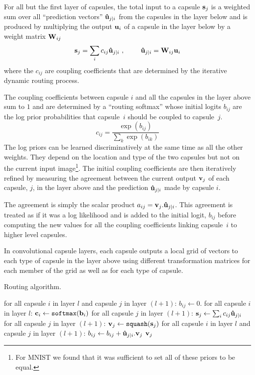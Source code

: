 \documentclass{article}
\begin{document}
For all but the first layer of capsules, the total input to a capsule ${\bf s}_j$ is a weighted sum over all ``prediction vectors'' ${\bf \hat{u}}_{j|i}$ from the capsules in the layer below and is produced by multiplying the output  ${\bf u}_i$ of a capsule in the layer below by a weight matrix  ${\bf W}_{ij}$
\begin{equation}
{\bf s}_j = \sum_i c_{ij} {\bf \hat{u}}_{j|i} \ , \ \ \ \ \ \ \ 
{\bf \hat{u}}_{j|i} = {\bf W}_{ij}{\bf u}_i 
\end{equation}where the $c_{ij}$ are coupling coefficients that are determined by the iterative dynamic routing process. 

The coupling coefficients between capsule $i$ and all the capsules in the layer above sum to $1$ and are determined by a ``routing softmax'' whose initial logits $b_{ij}$ are the log prior probabilities that capsule~$i$ should be coupled to capsule~$j$. 
\begin{equation}
c_{ij} = \frac{\exp(b_{ij})}{\sum_k \exp(b_{ik})}
\label{softmax}
\end{equation}
The log priors can be learned discriminatively at the same time as all the other weights.  They depend on the location and type of the two capsules but not on the current input image\footnote{For MNIST we found that it was sufficient to set all of these priors to be equal.}. The initial coupling coefficients are then iteratively refined by measuring the agreement between the current output ${\bf v}_j$ of each capsule, $j$, in the layer above and the prediction ${\bf \hat{u}}_{j|i}$ made by capsule $i$. 

The agreement is simply the scalar product $a_{ij} = {\bf v}_j . {\bf \hat{ u}}_{j|i}$.  This agreement is treated as if it was a log likelihood and is added to the initial logit, $b_{ij}$ before computing the new values for all the coupling coefficients linking capsule~$i$ to higher level capsules.

In convolutional capsule layers, each capsule outputs a local grid of vectors to each type of capsule in the layer above using different transformation matrices for each member of the grid as well as for each type of capsule.

\begin{algorithm}
\caption{Routing algorithm.}\label{routingalg}
\begin{algorithmic}[1]
\State for all capsule $i$ in layer $l$ and capsule $j$ in layer $(l+1)$: $b_{ij} \gets 0$.
\For{$r$ iterations}
\State for all capsule $i$ in layer $l$: ${\bf c}_i \gets \texttt{softmax}({\bf b}_i)$ 
\State for all capsule $j$ in layer $(l+1)$: ${\bf s}_j \gets \sum_i{c_{ij}{\bf \hat u}_{j|i}}$
\State for all capsule $j$ in layer $(l+1)$: ${\bf v}_j \gets \texttt{squash}({\bf s}_j)$ 
\State for all capsule $i$ in layer $l$ and capsule $j$ in layer $(l+1)$: $b_{ij} \gets b_{ij} + {\bf \hat{u}}_{j|i} . {\bf v}_j$
\EndFor
\Return ${\bf v}_j$
\EndProcedure
\end{algorithmic}
\end{algorithm}
\end{document}
